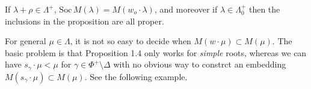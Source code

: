 \documentclass[11pt]{scrartcl}
\theoremstyle{definition}
\theoremstyle{theorem}
\theoremstyle{proof}
\theoremstyle{definition}
\theoremstyle{break}
\theoremstyle{problem}
\providecommand{\tightlist}{%
  \setlength{\itemsep}{0pt}\setlength{\parskip}{0pt}}
\newcommand{\soc}[0]{\mathrm{Soc}\,}
\begin{document}
\begin{description}
\tightlist
\item[Exercise (4.3)]
If \(\lambda + \rho \in \Lambda^+\),
\(\soc M(\lambda) = M(w_o \cdot \lambda)\), and moreover if
\(\lambda \in \Lambda_0^+\) then the inclusions in the proposition are
all proper.
\end{description}

\begin{description}
\tightlist
\item[Remark]
For general \(\mu \in \Lambda\), it is not so easy to decide when
\(M(w\cdot \mu) \subset M(\mu)\). The basic problem is that Proposition
1.4 only works for \emph{simple} roots, whereas we can have
\(s_\gamma \cdot \mu < \mu\) for \(\gamma \in \Phi^+\setminus \Delta\)
with no obvious way to constrct an embedding
\(M(s_\gamma \cdot \mu) \subset M(\mu)\). See the following example.
\end{description}
\end{document}
